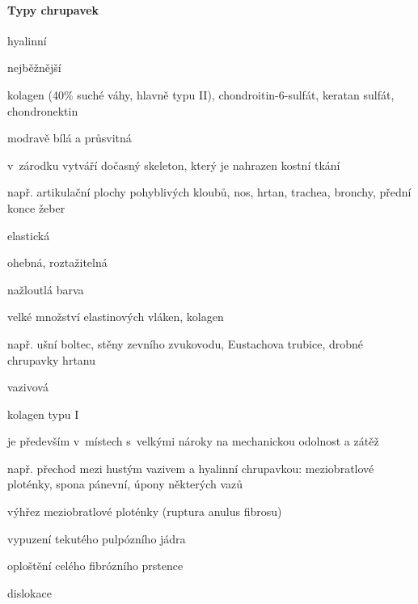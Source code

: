 \documentclass[DIV=8]{scrreprt}
\begin{document}
\paragraph{Typy chrupavek}
\begin{myItemize}[nosep]
    \item hyalinní
\begin{myItemize}[nosep]
    \item nejběžnější
    \item kolagen (40\% suché váhy, hlavně typu II), chondroitin-6-sulfát, keratan sulfát, chondronektin
    \item modravě bílá a průsvitná
    \item v zárodku vytváří dočasný skeleton, který je nahrazen kostní tkání
    \item např. artikulační plochy pohyblivých kloubů, nos, hrtan, trachea, bronchy, přední konce žeber
\end{myItemize}

    \item elastická
\begin{myItemize}[nosep]
    \item ohebná, roztažitelná
    \item nažloutlá barva
    \item velké množství elastinových vláken, kolagen
    \item např. ušní boltec, stěny zevního zvukovodu, Eustachova trubice, drobné chrupavky hrtanu
\end{myItemize}

    \item vazivová
\begin{myItemize}[nosep]
    \item kolagen typu I
    \item je především v místech s velkými nároky na mechanickou odolnost a zátěž
    \item např. přechod mezi hustým vazivem a hyalinní chrupavkou: meziobratlové ploténky, spona pánevní, úpony některých vazů
\begin{myItemize}[nosep]
    \item výhřez meziobratlové ploténky (ruptura anulus fibrosu)
\begin{myEnumerate}[nosep]
    \item vypuzení tekutého pulpózního jádra
    \item oploštění celého fibrózního prstence
    \item dislokace
\end{myEnumerate}

\end{myItemize}

\end{myItemize}

\end{myItemize}
\end{document}
